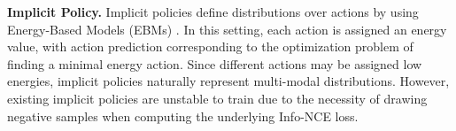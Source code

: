\documentclass[Afour,sageh,times]{sagej}
\newcommand{\yilun}[1]{\textcolor{MyPink}{[Yilun: #1]}}
\newcommand{\ben}[1]{\textcolor{MyGold}{[Ben: #1]}}
\newcommand\todo[1]{\textcolor{red}{[TODO: #1]}}
\begin{document}


\textbf{Implicit Policy.}
Implicit policies \citep{ibc, jarrett2020strictly} define distributions over actions by using Energy-Based Models (EBMs) \citep{lecun06atutorial, du2019implicit, dai2019exponential, grathwohl2020stein, du2020improved}. 
In this setting, each action is assigned an energy value, with action prediction corresponding to the optimization problem of finding a minimal energy action. Since different actions may be assigned low energies, implicit policies naturally represent multi-modal distributions. However, existing implicit policies \citep{ibc} are unstable to train due to the necessity of drawing negative samples when computing the underlying Info-NCE loss. %


\end{document}
